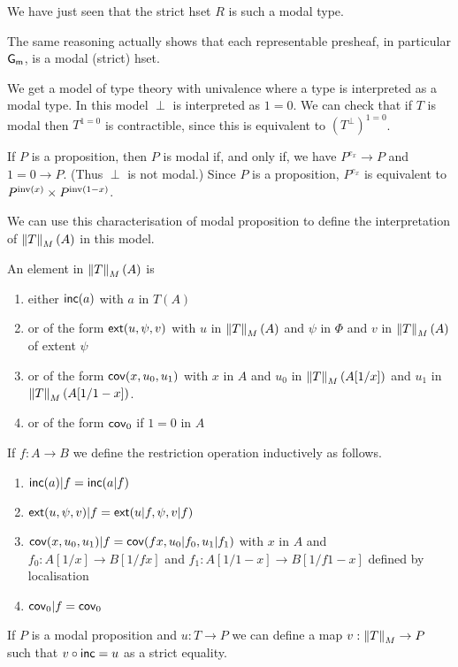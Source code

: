 \medskip

We have just seen that the strict hset $R$ is such a modal type.

The same reasoning actually shows that each representable presheaf, in particular $\mathsf{G_m}$, is a modal
(strict) hset.

\medskip

We get a model of type theory with univalence where a type is interpreted as a modal type.
In this model $\perp$ is interpreted as $1=0$. We can check that if $T$ is modal then
$T^{1=0}$ is contractible, since this is equivalent to $(T^{\perp})^{1=0}$.

\medskip

If $P$ is a proposition, then $P$ is modal if, and only if,
we have $P^{e_x}\rightarrow P$ and $1=0\rightarrow P$. (Thus $\perp$ is not modal.)
Since $P$ is a
proposition, $P^{e_x}$ is equivalent to $P^{\mathrm{inv}(x)}\times P^{\mathrm{inv}(1-x)}$.

\medskip

We can use this characterisation of modal proposition to define the interpretation of
$\left\lVert T \right\rVert_M(A)$ in this model.

An element in $\left\lVert T \right\rVert_M(A)$ is
\begin{enumerate}
\item either $\mathsf{inc}(a)$ with $a$ in $T(A)$
\item or of the form $\mathsf{ext}(u,\psi,v)$ with $u$ in $\left\lVert T \right\rVert_M(A)$ and $\psi$ in $\Phi$ and
  $v$ in $\left\lVert T \right\rVert_M(A)$ of extent $\psi$
\item or of the form $\mathsf{cov}(x,u_0,u_1)$ with $x$ in $A$ and $u_0$ in $\left\lVert T \right\rVert_M(A[1/x])$
  and $u_1$ in $\left\lVert T \right\rVert_M(A[1/1-x])$.
\item or of the form $\mathsf{cov}_0$ if $1 = 0$ in $A$  
\end{enumerate}

If $f:A\rightarrow B$ we define the restriction operation inductively as follows.
\begin{enumerate}
\item $\mathsf{inc}(a)|f = \mathsf{inc}(a|f)$
\item $\mathsf{ext}(u,\psi,v)|f = \mathsf{ext}(u|f,\psi,v|f)$
\item $\mathsf{cov}(x,u_0,u_1)|f = \mathsf{cov}(fx,u_0|f_0,u_1|f_1)$ with $x$ in $A$ 
 and $f_0:A[1/x]\rightarrow B[1/fx]$ and $f_1:A[1/1-x]\rightarrow B[1/f1-x]$ defined by localisation
\item $\mathsf{cov}_0|f = \mathsf{cov}_0$
\end{enumerate}

If $P$ is a modal proposition and $u:T\rightarrow P$ we can define a map $v:\left\lVert T \right\rVert_M\rightarrow P$
such that $v\circ\mathsf{inc} = u$ as a strict equality.

